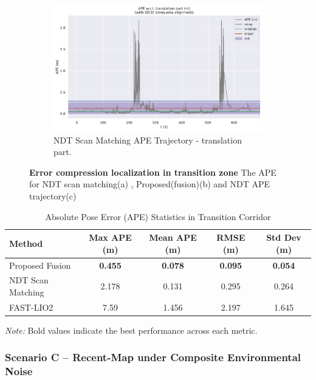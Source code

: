 \begin{figure}[H]
\begin{subfigure}[t]{0.49\textwidth}
{		}
		\label{fig:ape-error-unmapped-proposed}
	\end{subfigure}
    \begin{subfigure}[t]{0.49\textwidth}
    	\includegraphics[page=2 ,width=\linewidth]{images/unmappedzone_error_ndt2.pdf}
    	\caption{ NDT Scan Matching APE Trajectory  - translation part.
    	}
    	\label{fig:ape-error-trajectory-unmapped-proposed}
    \end{subfigure}
	\caption[Error compression  localization in transition zone]{
	\textbf{Error compression  localization in transition zone} The APE for NDT scan matching(a) , Proposed(fusion)(b) and NDT APE trajectory(c)}
	\label{fig:ape-error-unmapped}
\end{figure}

\begin{table}[H]
	\centering
	\caption{Absolute Pose Error (APE) Statistics in Transition Corridor}
	\label{tab:ape-unmapped-comparison}
	\begin{tabular}{lcccc}
		\toprule
		\textbf{Method} & \textbf{Max APE (m)} & \textbf{Mean APE (m)} & \textbf{RMSE (m)} & \textbf{Std Dev (m)} \\
		\midrule
		Proposed Fusion   &\textbf{ 0.455} & \textbf{0.078} & \textbf{0.095} &\textbf{ 0.054} \\
		NDT Scan Matching & 2.178 & 0.131 & 0.295 & 0.264 \\
		FAST-LIO2   & 7.59 & 1.456  & 2.197 & 1.645 \\
		
		
		\bottomrule
	\end{tabular}
{\footnotesize \textit{Note:} Bold values indicate the best performance across each metric.}
\end{table}


\subsubsection{Scenario C – Recent-Map under Composite Environmental Noise}

